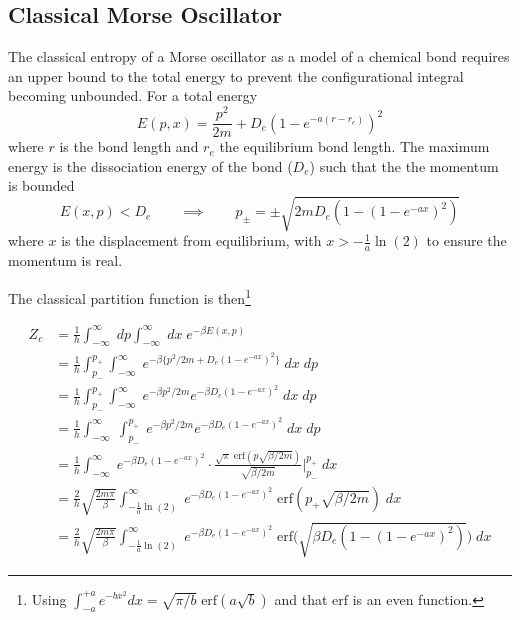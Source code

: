 \documentclass[../main.tex]{subfiles}
\begin{document}
\subsection{Classical Morse Oscillator}

The classical entropy of a Morse oscillator as a model of a chemical bond requires an upper bound to the total energy to prevent the configurational integral becoming unbounded. For a total energy 
\begin{equation}
	E(p, x) = \frac{p^2}{2m} + D_e (1 - e^{-a(r-r_e)})^2
\end{equation}
where $r$ is the bond length and $r_e$ the equilibrium bond length. The maximum energy is the dissociation energy of the bond ($D_e$) such that the the momentum is bounded
\begin{equation}
	E(x, p) < D_e \qquad \implies \qquad p_\pm = \pm \sqrt{2mD_e(1 - (1-e^{-ax})^2)}
\end{equation}
where $x$ is the displacement from equilibrium, with $x > -\frac{1}{a}\ln(2)$ to ensure the momentum is real. 

The classical partition function is then\footnote{Using $\int_{-a}^{+a}  e^{-bx^2} dx = \sqrt{\pi/b}\;\text{erf}(a\sqrt{b})$ and that $\text{erf}$ is an even function.}

\begin{equation}
	\begin{aligned}
		Z_c &= \frac{1}{h}\int_{-\infty}^\infty \; dp\int_{-\infty}^{\infty} \; dx \; e^{-\beta E(x,p)} \\
		&= \frac{1}{h}\int_{p_-}^{p_+} \int_{-\infty}^{\infty}\; e^{-\beta \{{p^2}/{2m} + D_e (1 - e^{-ax})^2\}}  \; dx  \; dp \\
		&= \frac{1}{h}\int_{p_-}^{p_+} \int_{-\infty}^{\infty}\; e^{-\beta {p^2}/{2m}} e^{-\beta D_e (1 - e^{-ax})^2}  \; dx  \; dp \\
		&= \frac{1}{h} \int_{-\infty}^{\infty}\;\int_{p_-}^{p_+}\; e^{-\beta {p^2}/{2m}} e^{-\beta D_e (1 - e^{-ax})^2}  \; dx  \; dp \\
		&= \frac{1}{h} \int_{-\infty}^{\infty}\; e^{-\beta D_e (1 - e^{-ax})^2}  \cdot \frac{\sqrt{\pi}\;\text{erf}(p\sqrt{\beta/2m})}{\sqrt{\beta/2m}} \Bigg|_{p_-}^{p_+} \; dx \\
		&= \frac{2}{h}\sqrt{\frac{2m\pi}{\beta}} \int_{-\frac{1}{a}\ln(2)}^{\infty}\; e^{-\beta D_e (1 - e^{-ax})^2}   \;\text{erf}(p_+\sqrt{\beta/2m}) \; dx \\
		&= \frac{2}{h}\sqrt{\frac{2m\pi}{\beta}} \int_{-\frac{1}{a}\ln(2)}^{\infty}\; e^{-\beta D_e (1 - e^{-ax})^2}   \;\text{erf}{\Big (} \sqrt{\beta D_e(1 - (1-e^{-ax})^2)}{\Big )} \; dx 
	\end{aligned}
	\label{morse_pf_integral}
\end{equation}
\end{document}
